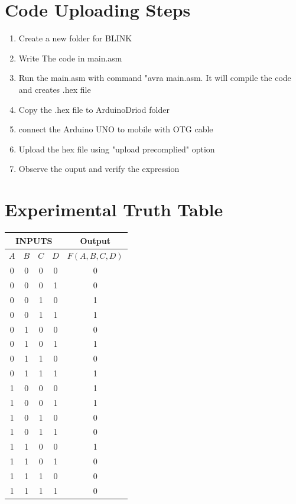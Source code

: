 \documentclass[a4paper,12pt]{article}
\begin{document}
\section*{Code Uploading Steps}
\begin{enumerate}
        \item Create a new folder for BLINK
        \item Write The code in main.asm
        \item Run the main.asm with command "avra main.asm. It will compile the code and creates .hex file
        \item Copy the .hex file to ArduinoDriod folder
        \item connect the Arduino UNO to mobile with OTG cable
        \item Upload the hex file using "upload precomplied" option
        \item Observe the ouput and verify the expression
\end{enumerate}
\section*{Experimental Truth Table}
\begin{center}
\begin{tabular}{|c|c|c|c|c|}
\hline
\multicolumn{4}{|c|}{\textbf{INPUTS}} & \textbf{Output} \\
\hline
$A$ & $B$ & $C$ & $D$ & $F(A,B,C,D)$ \\
\hline
0 & 0 & 0 & 0 & 0 \\ 
0 & 0 & 0 & 1 & 0 \\ 
0 & 0 & 1 & 0 & 1 \\ 
0 & 0 & 1 & 1 & 1 \\ 
0 & 1 & 0 & 0 & 0 \\ 
0 & 1 & 0 & 1 & 1 \\ 
0 & 1 & 1 & 0 & 0 \\ 
0 & 1 & 1 & 1 & 1 \\ 
1 & 0 & 0 & 0 & 1 \\ 
1 & 0 & 0 & 1 & 1 \\ 
1 & 0 & 1 & 0 & 0 \\ 
1 & 0 & 1 & 1 & 0 \\ 
1 & 1 & 0 & 0 & 1 \\ 
1 & 1 & 0 & 1 & 0 \\ 
1 & 1 & 1 & 0 & 0 \\ 
1 & 1 & 1 & 1 & 0 \\ 
\hline
\end{tabular}
\end{center}
\end{document}
